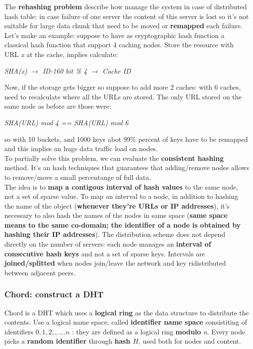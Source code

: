 \documentclass[10pt,a4paper]{report}
\begin{document}
The \textbf{rehashing problem} describe how manage the system in case of distributed hash table: in case failure of one server the content of this server is lost so it's not suitable for large data chunk that need to be moved or \textbf{remapped} each failure. \\
Let's make an example: suppose to have as cryptographic hash function a classical hash function that support 4 caching nodes. Store the resource with URL \textit{x} at the cache, implies calculate:
\begin{center}
	\textit{SHA(x)  $\rightarrow$ ID-160 bit \% 4 $\rightarrow$ Cache ID}
\end{center}

Now, if the storage gets bigger so suppose to add more $2$ caches: with $6$ caches, need to recalculate where all the URLs are stored. The only URL stored on the same node as before are those were:
\begin{center}
	\textit{SHA(URL) mod 4 == SHA(URL) mod 6}
\end{center}
so with 10 buckets, and 1000 keys abot 99\% percent of keys have to be remapped and this implies an huge data traffic load on nodes.\\
To partially solve this problem, we can evaluate the \textbf{consistent hashing} method. It's an hash techniques that guarantees that adding/remove nodes allows to remove/move a small percentange of full data.\\
The idea is to \textbf{map a contigous interval of hash values} to the same node, not a set of sparse value. To map an interval to a node, in addition to hashing the name of the object (\textbf{whenever they're URLs or IP addresses}), it's necessary to also hash the names of the nodes in same space (\textbf{same space means to the same co-domain; the identifier of a node is obtained by hashing their IP addresses}).
The distribution scheme does not depend directly on the number of servers: each node manages an \textbf{interval of consecutive hash keys} and not a set of sparse keys. Intervals are \textbf{joined/splitted} when nodes join/leave the network and key ridistributed between adjacent peers.
\subsubsection{Chord: construct a DHT}\label{sec:chord-construct-a-dht}



Chord is a DHT which uses a  \textbf{logical ring} as the data structure to distribute the contents.
Use a logical name space, called \textbf{identifier name space} consistiting of identifiers ${0,1,2,,....n}$ : they are defined as a logical ring \textbf{modulo} \textit{n}.
Every node picks a \textbf{random identifier} through \textbf{hash $H$}, used both for nodes and content.
\end{document}
